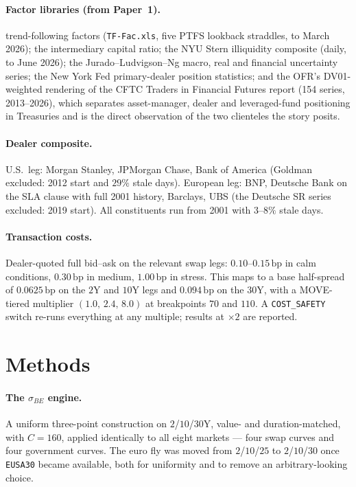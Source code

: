 \documentclass[11pt]{article}
\newcommand{\bp}{\,\mathrm{bp}}
\newcommand{\sBE}{\sigma_{BE}}
\begin{document}
\paragraph{Factor libraries (from Paper~1).} \citet{fh2001} trend-following factors
(\texttt{TF-Fac.xls}, five PTFS lookback straddles, to March 2026); the \citet{hkm2017} intermediary
capital ratio; the NYU Stern illiquidity composite (daily, to June 2026); the
Jurado--Ludvigson--Ng macro, real and financial uncertainty series; the New York Fed primary-dealer
position statistics; and the OFR's DV01-weighted rendering of the CFTC Traders in Financial Futures
report (154 series, 2013--2026), which separates asset-manager, dealer and leveraged-fund positioning
in Treasuries and is the direct observation of the two clienteles the story posits.

\paragraph{Dealer composite.} U.S.\ leg: Morgan Stanley, JPMorgan Chase, Bank of America (Goldman
excluded: 2012 start and $29\%$ stale days). European leg: BNP, Deutsche Bank on the SLA clause with
full 2001 history, Barclays, UBS (the Deutsche SR series excluded: 2019 start). All constituents run
from 2001 with $3$--$8\%$ stale days.

\paragraph{Transaction costs.} Dealer-quoted full bid--ask on the relevant swap legs: $0.10$--$0.15\bp$
in calm conditions, $0.30\bp$ in medium, $1.00\bp$ in stress. This maps to a base half-spread of
$0.0625\bp$ on the $2$Y and $10$Y legs and $0.094\bp$ on the $30$Y, with a MOVE-tiered multiplier
$(1.0,\,2.4,\,8.0)$ at breakpoints $70$ and $110$. A \texttt{COST\_SAFETY} switch re-runs everything at
any multiple; results at $\times 2$ are reported.

\section{Methods}\label{sec:methods}

\paragraph{The $\sBE$ engine.} A uniform three-point construction on $2$/$10$/$30$Y, value- and
duration-matched, with $C=160$, applied identically to all eight markets --- four swap curves and four
government curves. The euro fly was moved from $2$/$10$/$25$ to $2$/$10$/$30$ once \texttt{EUSA30}
became available, both for uniformity and to remove an arbitrary-looking choice.
\end{document}
